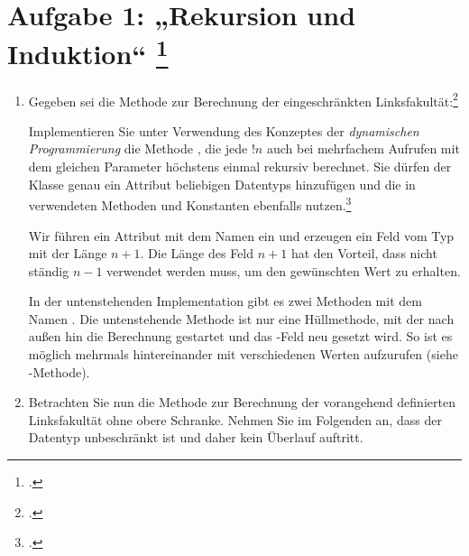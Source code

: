 \documentclass{lehramt-informatik-aufgabe}
\begin{document}
\def\lf#1{\text{lfLong}(#1)}
\def\sk#1{\sum^{#1}_{k=0}k!}


\section{Aufgabe 1: „Rekursion und Induktion“
\footcite[Thema 1 Aufgabe 1b Seite 2-3]{examen:66115:2014:03}}

\begin{enumerate}


\item Gegeben sei die Methode  zur
Berechnung der eingeschränkten Linksfakultät:\footcite[Seite
25]{aud:fs:1}


Implementieren Sie unter Verwendung des Konzeptes der \emph{dynamischen
Programmierung} die Methode , die
jede $!n$ auch bei mehrfachem Aufrufen mit dem gleichen Parameter
höchstens einmal rekursiv berechnet. Sie dürfen der Klasse
 genau ein Attribut beliebigen Datentyps
hinzufügen und die in  verwendeten Methoden und
Konstanten ebenfalls nutzen.\footcite[Aufgabe 5]{aud:pu:1}

\begin{liAntwort}
Wir führen ein Attribut mit dem Namen  ein und
erzeugen ein Feld vom Typ  mit der Länge $n+1$.
Die Länge des Feld $n+1$ hat den Vorteil, dass nicht ständig $n-1$
verwendet werden muss, um den gewünschten Wert zu erhalten.

In der untenstehenden Implementation gibt es zwei Methoden mit dem Namen
. Die untenstehende Methode ist nur eine Hüllmethode, mit
der nach außen hin die Berechnung gestartet und das
-Feld neu gesetzt wird. So ist es möglich
 mehrmals hintereinander mit verschiedenen Werten
aufzurufen (siehe -Methode).

\end{liAntwort}


\item Betrachten Sie nun die Methode  zur
Berechnung der vorangehend definierten Linksfakultät ohne obere
Schranke. Nehmen Sie im Folgenden an, dass der Datentyp
 unbeschränkt ist und daher kein Überlauf auftritt.


\end{enumerate}
\end{document}
